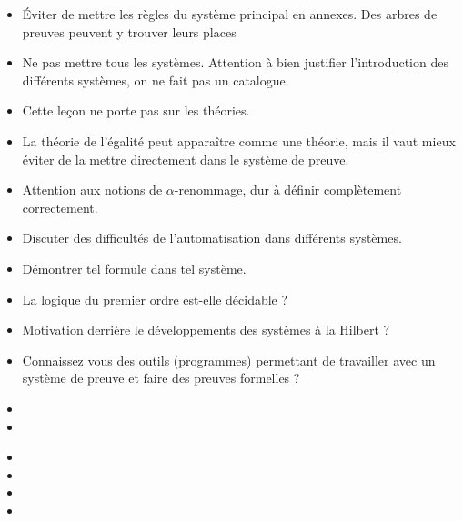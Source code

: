 \documentclass{agregfiche}
\begin{document}
\begin{itemize}
	\item Éviter de mettre les règles du système principal en annexes. Des arbres de preuves peuvent y trouver leurs places
	\item Ne pas mettre tous les systèmes. Attention à bien justifier l'introduction des différents systèmes, on ne fait pas un catalogue.
	\item Cette leçon ne porte pas sur les théories.
    \item La théorie de l'égalité peut apparaître comme une théorie, mais il vaut mieux éviter de la mettre directement dans le système de preuve.
    \item Attention aux notions de $\alpha$-renommage, dur à définir complètement correctement.
\end{itemize}

\secquestionsclassiques

\begin{itemize}
	\item Discuter des difficultés de l'automatisation dans différents systèmes.
	\item Démontrer tel formule dans tel système.
	\item La logique du premier ordre est-elle décidable ?
	\item Motivation derrière le développements des systèmes à la Hilbert ?
	\item Connaissez vous des outils (programmes) permettant de travailler avec un système de preuve et faire des preuves formelles ?
\end{itemize}

\secreferences

\begin{itemize}
\item 
\item 

\end{itemize}

\secdev

\begin{itemize}
\item {}
\item {}
\item {}
\item {}
\end{itemize}
\end{document}
